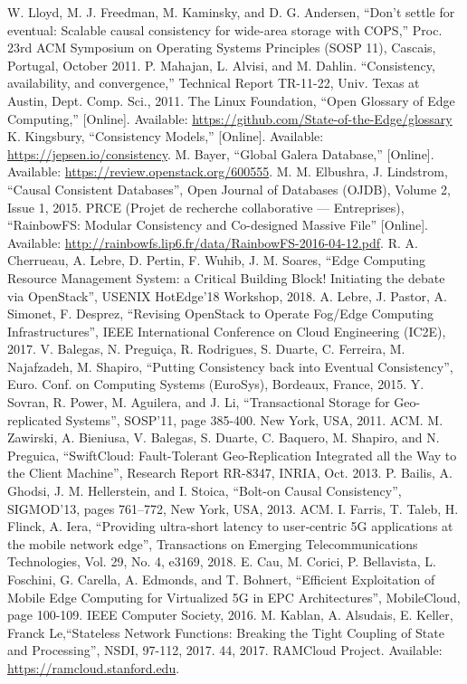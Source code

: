 \documentclass[conference]{IEEEtran}
\begin{document}
\begin{thebibliography}{00}
 W. Lloyd, M. J. Freedman, M. Kaminsky, and D. G. Andersen, ``Don’t settle for eventual: Scalable causal consistency for wide-area storage with COPS,'' Proc. 23rd ACM Symposium on Operating Systems Principles (SOSP 11), Cascais, Portugal, October 2011.
 P. Mahajan, L. Alvisi, and M. Dahlin. ``Consistency, availability, and convergence,'' Technical Report TR-11-22, Univ. Texas at Austin, Dept. Comp. Sci., 2011.
 The Linux Foundation, ``Open Glossary of Edge Computing,'' [Online]. Available: \url{https://github.com/State-of-the-Edge/glossary}
 K. Kingsbury, ``Consistency Models,'' [Online]. Available: \url{https://jepsen.io/consistency}.
 M. Bayer, ``Global Galera Database,'' [Online]. Available: \url{https://review.openstack.org/600555}.
 M. M. Elbushra, J. Lindstrom, ``Causal Consistent Databases'', Open Journal of Databases (OJDB), Volume 2, Issue 1, 2015.
 PRCE (Projet de recherche collaborative — Entreprises), ``RainbowFS: Modular Consistency and Co-designed Massive File'' [Online]. Available: \url{http://rainbowfs.lip6.fr/data/RainbowFS-2016-04-12.pdf}.
 R. A. Cherrueau, A. Lebre, D. Pertin, F. Wuhib, J. M. Soares, ``Edge Computing Resource Management System: a Critical Building Block! Initiating the debate via OpenStack'', USENIX HotEdge’18 Workshop, 2018.
 A. Lebre, J. Pastor, A. Simonet, F. Desprez, ``Revising OpenStack to Operate Fog/Edge Computing Infrastructures'', IEEE International Conference on Cloud Engineering (IC2E), 2017.
 V. Balegas, N. Preguiça, R. Rodrigues, S. Duarte, C. Ferreira, M. Najafzadeh, M. Shapiro, ``Putting Consistency back into Eventual Consistency'', Euro. Conf. on Computing Systems (EuroSys), Bordeaux, France, 2015.
 Y. Sovran, R. Power, M. Aguilera, and J. Li, ``Transactional Storage for Geo-replicated Systems'', SOSP'11, page 385-400. New York, USA, 2011. ACM.
 M. Zawirski, A. Bieniusa, V. Balegas, S. Duarte, C. Baquero, M. Shapiro, and N. Preguica, ``SwiftCloud: Fault-Tolerant Geo-Replication Integrated all the Way to the Client Machine'', Research Report RR-8347, INRIA, Oct. 2013.
 P. Bailis, A. Ghodsi, J. M. Hellerstein, and I. Stoica, ``Bolt-on Causal Consistency'', SIGMOD'13, pages 761–772, New York, USA, 2013. ACM.
 I. Farris, T. Taleb, H. Flinck, A. Iera, ``Providing ultra‐short latency to user‐centric 5G applications at the mobile network edge'', Transactions on Emerging Telecommunications Technologies, Vol. 29, No. 4, e3169, 2018.
 E. Cau, M. Corici, P. Bellavista, L. Foschini, G. Carella, A. Edmonds, and T. Bohnert, ``Efficient Exploitation of Mobile Edge Computing for Virtualized 5G in EPC Architectures'', MobileCloud, page 100-109. IEEE Computer Society, 2016.
 M. Kablan, A. Alsudais, E. Keller, Franck Le,``Stateless Network Functions: Breaking the Tight Coupling of State and Processing'', NSDI, 97-112, 2017. 44, 2017.
 RAMCloud Project. Available: \url{https://ramcloud.stanford.edu}.
\end{thebibliography}
\end{document}
